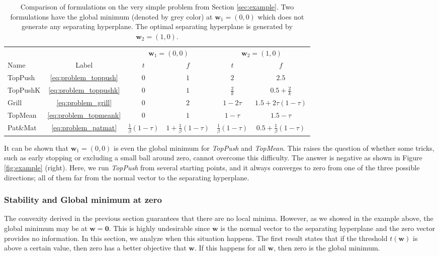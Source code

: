 \documentclass[]{interact}
\theoremstyle{plain}%
\theoremstyle{definition}
\theoremstyle{remark}
\newcommand{\atoppush}{TopPush\xspace}
\newcommand{\atoppushk}{TopPushK\xspace}
\newcommand{\agrill}{Grill\xspace}
\newcommand{\apatmat}{Pat\&Mat\xspace}
\newcommand{\atopmeank}{TopMean\xspace}
\newcommand{\toppush}{\emph{TopPush}\xspace}
\newcommand{\topmeank}{\emph{TopMean}\xspace}
\begin{document}
\begin{table}[!ht]
\caption{Comparison of formulations on the very simple problem from Section \ref{sec:example}. Two formulations have the global minimum (denoted by grey color) at $\bm w_1=(0,0)$ which does not generate any separating hyperplane. The optimal separating hyperplane is generated by $\bm w_2=(1,0)$.}
\label{tab:example}
\centering
\begin{tabular}{@{}l ccccc@{}}\toprule
& & \multicolumn{2}{c}{$\bm w_1=(0,0)$} & \multicolumn{2}{c}{$\bm w_2=(1,0)$} \\ \cmidrule(lr){3-4} \cmidrule(lr){5-6}
Name & Label & $t$& $f$ & $t$ & $f$ \\
\midrule
\atoppush & \eqref{eq:problem_toppush} & $0$ & \cellcolor{gray!40}$1$ & $2$ & $2.5$ \\
\atoppushk & \eqref{eq:problem_toppushk} & $0$ & $1$ & $\frac2k$ & \cellcolor{gray!40}$0.5+\frac2k$ \\
\agrill & \eqref{eq:problem_grill} & $0$ & $2$ & $1-2\tau$ & \cellcolor{gray!40}$1.5+2\tau(1-\tau)$ \\
\atopmeank & \eqref{eq:problem_topmeank} & $0$ & \cellcolor{gray!40}$1$ & $1-\tau$ & $1.5-\tau$ \\
\apatmat & \eqref{eq:problem_patmat}  & $\frac{1}{\beta}(1-\tau)$ & $1+\frac{1}{\beta}(1-\tau)$ & $\frac{1}{\beta}(1-\tau)$ & \cellcolor{gray!40}$0.5+\frac{1}{\beta}(1-\tau)$ \\
\bottomrule
\end{tabular}
\end{table}

It can be shown that $\bm w_1=(0,0)$ is even the global minimum for \toppush and \topmeank. This raises the question of whether some tricks, such as early stopping or excluding a small ball around zero, cannot overcome this difficulty. The answer is negative as shown in Figure \ref{fig:example} (right). Here, we run \toppush from several starting points, and it always converges to zero from one of the three possible directions; all of them far from the normal vector to the separating hyperplane.



\subsubsection{Stability and Global minimum at zero}\label{sec:w_zero}


The convexity derived in the previous section guarantees that there are no local minima. However, as we showed in the example above, the global minimum may be at $\bm w=\bm 0$. This is highly undesirable since $\bm w$ is the normal vector to the separating hyperplane and the zero vector provides no information. In this section, we analyze when this situation happens. The first result states that if the threshold $t(\bm w)$ is above a certain value, then zero has a better objective that $\bm w$. If this happens for all $\bm w$, then zero is the global minimum.
\end{document}
